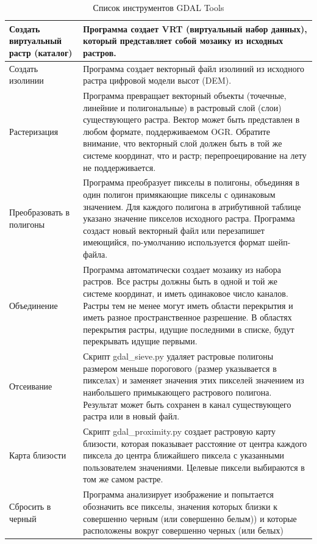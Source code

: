 {\setlength{\extrarowheight}{15pt}
\begin{longtable}{|p{3cm}|p{13cm}|}
\caption{Список инструментов GDAL Tools}\label{tab:gdaltools} \\
\hline Создать виртуальный растр (каталог) & Программа создает VRT
 (виртуальный набор данных), который представляет собой мозаику из исходных растров. \\
\hline Создать изолинии & Программа создает векторный файл изолиний из
 исходного растра цифровой модели высот (DEM).\\
\hline Растеризация &  Программа превращает векторный объекты (точечные,
 линейние и полигональные) в растровый слой (слои) существующего растра.
 Вектор может быть представлен в любом формате, поддерживаемом OGR. Обратите
 внимание, что векторный слой должен быть в той же системе координат, что и
 растр; перепроецирование на лету не поддерживается.\\
\hline Преобразовать в полигоны & Программа преобразует пикселы в полигоны,
 объединяя в один полигон примякающие пикселы с одинаковым значением. Для
 каждого полигона в атрибутивной таблице указано значение пикселов исходного
 растра. Программа создаст новый векторный файл или перезапишет имеющийся,
 по-умолчанию используется формат шейп-файла.\\
\hline Объединение &  Программа автоматически создает мозаику из набора растров.
 Все растры должны быть в одной и той же системе координат, и иметь одинаковое
 число каналов. Растры тем не менее могут иметь области перекрытия и иметь разное
 пространственное разрешение. В областях перекрытия растры, идущие последними в
 списке, будут перекрывать идущие первыми. \\
\hline Отсеивание & Скрипт gdal\_sieve.py удаляет растровые полигоны размером
 меньше порогового (размер указывается в пикселах) и заменяет значения этих
 пикселей значением из наибольшего примыкающего растрового полигона. Результат
 может быть сохранен в канал существующего растра или в новый файл.\\
\hline Карта близости & Скрипт gdal\_proximity.py создает растровую карту
 близости, которая показывает расстояние от центра каждого пиксела до центра
 ближайшего пиксела с указанными пользователем значениями. Целевые пиксели
 выбираются в том же самом растре.\\
\hline Сбросить в черный & Программа анализирует изображение и попытается
 обозначить все пикселы, значения которых близки к совершенно черным (или
 совершенно белым)) и которые расположены вокруг совершенно черных (или белых)

\end{longtable}}
